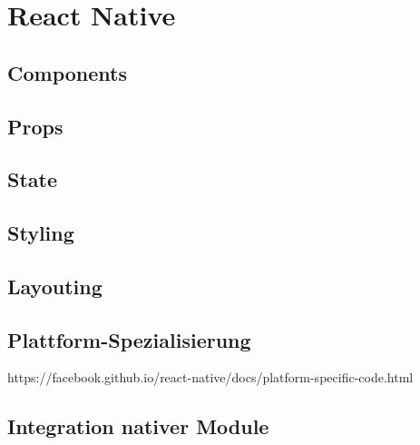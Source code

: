 \section{React Native}

\subsection{Components}

\subsection{Props}

\subsection{State}

\subsection{Styling}

\subsection{Layouting}

\subsection{Plattform-Spezialisierung}
https://facebook.github.io/react-native/docs/platform-specific-code.html

\subsection{Integration nativer Module}


